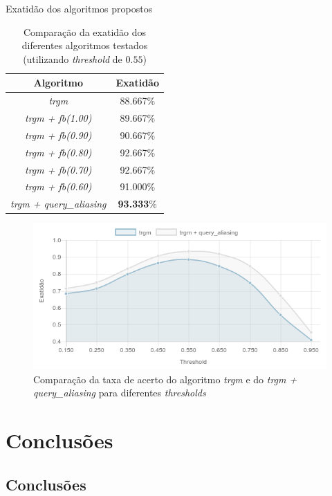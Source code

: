 \documentclass{beamer}
\begin{document}
\begin{frame}{Exatidão dos algoritmos propostos}
  \begin{table}
    \begin{tabular}{ c | c }
      \textbf{Algoritmo} & \textbf{Exatidão} \\
      \hline \hline
      \textit{trgm} & 88.667\% \\
      \textit{trgm + fb(1.00)} & 89.667\% \\
      \textit{trgm + fb(0.90)} & 90.667\% \\
      \textit{trgm + fb(0.80)} & 92.667\% \\
      \textit{trgm + fb(0.70)} & 92.667\% \\
      \textit{trgm + fb(0.60)} & 91.000\% \\
      \textit{trgm + query\_aliasing} & \textbf{93.333}\%
    \end{tabular}
    \caption{Comparação da exatidão dos diferentes algoritmos testados (utilizando \textit{threshold} de $0.55$)}
  \end{table}
\end{frame}

\begin{frame}
  \begin{figure}
    \includegraphics[width=\textwidth]{figuras/avaliacao-algoritmos.png}
    \caption{Comparação da taxa de acerto do algoritmo \textit{trgm} e do \textit{trgm + query\_aliasing} para diferentes \textit{thresholds}}
  \end{figure}
\end{frame}

\section{Conclusões}
\subsection*{Conclusões}
\end{document}
